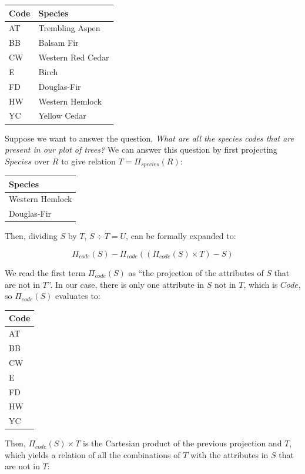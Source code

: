 \documentclass[
]{book}
\begin{document}
\begin{tabular}{ll}
\toprule
Code & Species\\
\midrule
AT & Trembling Aspen\\
BB & Balsam Fir\\
CW & Western Red Cedar\\
E & Birch\\
FD & Douglas-Fir\\
\addlinespace
HW & Western Hemlock\\
YC & Yellow Cedar\\
\bottomrule
\end{tabular}

Suppose we want to answer the question, \emph{What are all the species codes that are present in our plot of trees?} We can answer this question by first projecting \(Species\) over \(R\) to give relation \(T=Π_{species}(R)\):

\begin{tabular}{l}
\toprule
Species\\
\midrule
Western Hemlock\\
Douglas-Fir\\
\bottomrule
\end{tabular}

Then, dividing \(S\) by \(T\), \(S÷T=U\), can be formally expanded to:

\[
Π_{code}(S) - Π_{code}((Π_{code}(S) × T) - S)
\]

We read the first term \(Π_{code}(S)\) as ``the projection of the attributes of \(S\) that are not in \(T\)''. In our case, there is only one attribute in \(S\) not in \(T\), which is \(Code\), so \(Π_{code}(S)\) evaluates to:

\begin{tabular}{l}
\toprule
Code\\
\midrule
AT\\
BB\\
CW\\
E\\
FD\\
\addlinespace
HW\\
YC\\
\bottomrule
\end{tabular}

Then, \(Π_{code}(S)×T\) is the Cartesian product of the previous projection and \(T\), which yields a relation of all the combinations of \(T\) with the attributes in \(S\) that are not in \(T\):
\end{document}
